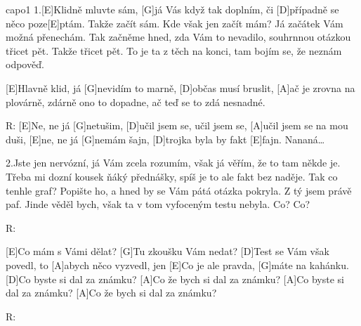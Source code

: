 \hfill capo1
1.[E]Klidně mluvte sám, [G]já Vás když tak doplním, 
či [D]případně se něco poze[E]ptám.
Takže začít sám. Kde však jen začít mám?
Já začátek Vám možná přenechám.
Tak začněme hned, zda Vám to nevadilo, 
souhrnnou otázkou třicet pět.
Takže třicet pět. To je ta z těch na konci,
tam bojím se, že neznám odpověď.

[E]Hlavně klid, já [G]nevidím to marně,
[D] občas musí bruslit, 
[A]ač je zrovna na plovárně,
zdárně ono to dopadne,
ač teď se to zdá nesnadné.

R: [E]Ne, ne já [G]netušim,
[D]učil jsem se, učil jsem se, [A]učil jsem se na mou duši,
[E]ne, ne já [G]nemám šajn,
[D]trojka byla by fakt [E]fajn.
Nananá… \slpc


2.Jste jen nervózní, já Vám zcela rozumím,
však já věřím, že to tam někde je. 
Třeba mi dozní kousek ňáký přednášky,
spíš je to ale fakt bez naděje. 
Tak co tenhle graf? Popište ho, a hned by se
Vám pátá otázka pokryla.  
Z tý jsem právě paf. Jinde věděl bych, však ta v tom
vyfoceným testu nebyla.
Co?
Co?

R:

[E]Co mám s Vámi dělat? [G]Tu zkoušku Vám nedat?
[D]Test se Vám však povedl, to [A]abych něco vyzvedl, jen
[E]Co je ale pravda, [G]máte na kahánku.
[D]Co byste si dal za známku?
[A]Co že bych si dal za známku?
[A]Co byste si dal za známku?
[A]Co že bych si dal za známku?

R: